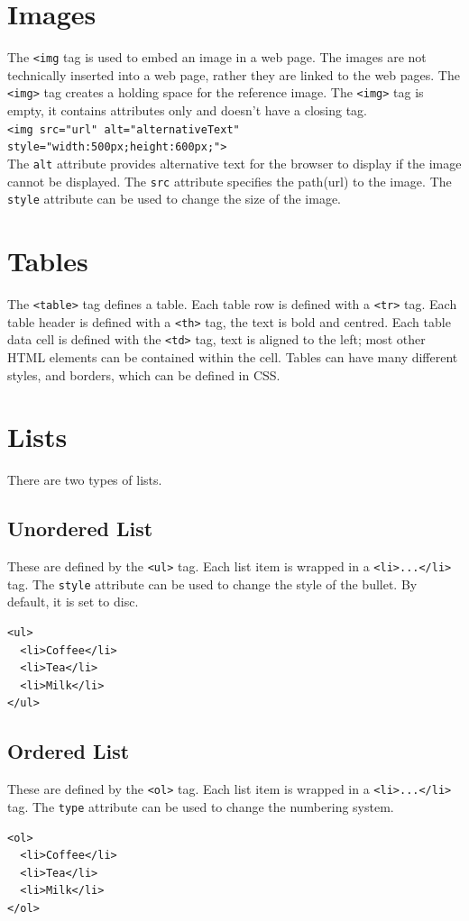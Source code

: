 \documentclass{thomasClass}
\begin{document}
\section{Images}
The \verb|<img| tag is used to embed an image in a web page. The images are not technically inserted into a web page, rather they are linked to the web pages. The \verb|<img>| tag creates a holding space for the reference image. The \verb|<img>| tag is empty, it contains attributes only and doesn't have a closing tag.\\
\verb|<img src="url" alt="alternativeText" style="width:500px;height:600px;">|\\
The \verb|alt| attribute provides alternative text for the browser to display if the image cannot be displayed. The \verb|src| attribute specifies the path(url) to the image. The \verb|style| attribute can be used to change the size of the image.

\section{Tables}
The \verb|<table>| tag defines a table. Each table row is defined with a \verb|<tr>| tag. Each table header is defined with a \verb|<th>| tag, the text is bold and centred. Each table data cell is defined with the \verb|<td>| tag, text is aligned to the left; most other HTML elements can be contained within the cell. Tables can have many different styles, and borders, which can be defined in CSS.

\section{Lists}
There are two types of lists.
\subsection{Unordered List}
These are defined by the \verb|<ul>| tag. Each list item is wrapped in a \verb|<li>...</li>| tag. The \verb|style| attribute can be used to change the style of the bullet. By default, it is set to disc.
\begin{verbatim}
<ul>
  <li>Coffee</li>
  <li>Tea</li>
  <li>Milk</li>
</ul>
\end{verbatim}
\subsection{Ordered List}
These are defined by the \verb|<ol>| tag. Each list item is wrapped in a \verb|<li>...</li>| tag. The \verb|type| attribute can be used to change the numbering system.
\begin{verbatim}
<ol>
  <li>Coffee</li>
  <li>Tea</li>
  <li>Milk</li>
</ol>
\end{verbatim}
\end{document}
